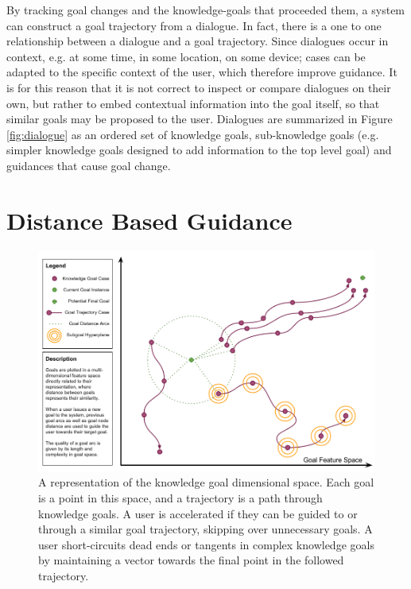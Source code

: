\documentclass[letterpaper]{article}
\begin{document}
By tracking goal changes and the knowledge-goals that proceeded them, a system can construct a goal trajectory from a dialogue. In fact, there is a one to one relationship between a dialogue and a goal trajectory. Since dialogues occur in context, e.g. at some time, in some location, on some device; cases can be adapted to the specific context of the user, which therefore improve guidance. It is for this reason that it is not correct to inspect or compare dialogues on their own, but rather to embed contextual information into the goal itself, so that similar goals may be proposed to the user. Dialogues are summarized in Figure \ref{fig:dialogue} as an ordered set of knowledge goals, sub-knowledge goals (e.g. simpler knowledge goals designed to add information to the top level goal) and guidances that cause goal change.

\section{Distance Based Guidance}

\begin{figure}
	\centering
    \includegraphics[width=\columnwidth]{figures/representation.png}
    \caption{A representation of the knowledge goal dimensional space. Each goal is a point in this space, and a trajectory is a path through knowledge goals. A user is accelerated if they can be guided to or through a similar goal trajectory, skipping over unnecessary goals. A user short-circuits dead ends or tangents in complex knowledge goals by maintaining a vector towards the final point in the followed trajectory.}
    \label{fig:representation}
\end{figure}
\end{document}

